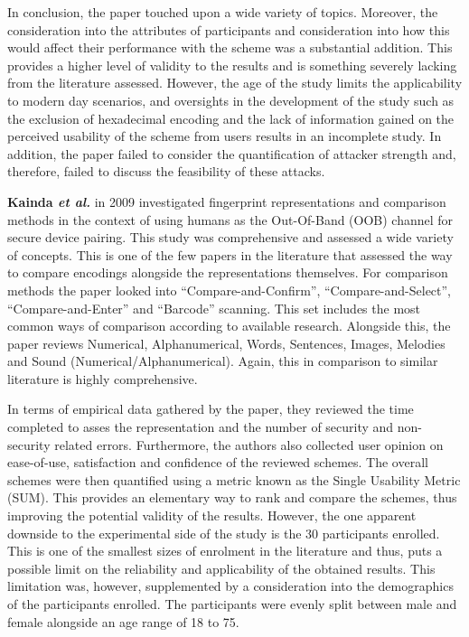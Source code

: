 In conclusion, the paper touched upon a wide variety of topics. Moreover, the consideration into the attributes of participants and consideration into how this would affect their performance with the scheme was a substantial addition. This provides a higher level of validity to the results and is something severely lacking from the literature assessed. However, the age of the study limits the applicability to modern day scenarios, and oversights in the development of the study such as the exclusion of hexadecimal encoding and the lack of information gained on the perceived usability of the scheme from users results in an incomplete study. In addition, the paper failed to consider the quantification of attacker strength and, therefore, failed to discuss the feasibility of these attacks.

\textbf{Kainda \textit{et al.}}\cite{kainda2009usability} in 2009 investigated fingerprint representations and comparison methods in the context of using humans as the Out-Of-Band (OOB) channel for secure device pairing. This study was comprehensive and assessed a wide variety of concepts. This is one of the few papers in the literature that assessed the way to compare encodings alongside the representations themselves. For comparison methods the paper looked into ``Compare-and-Confirm'', ``Compare-and-Select'', ``Compare-and-Enter'' and ``Barcode'' scanning. This set includes the most common ways of comparison according to available research. Alongside this, the paper reviews Numerical, Alphanumerical, Words, Sentences, Images, Melodies and Sound (Numerical/Alphanumerical). Again, this in comparison to similar literature is highly comprehensive.

In terms of empirical data gathered by the paper, they reviewed the time completed to asses the representation and the number of security and non-security related errors. Furthermore, the authors also collected user opinion on ease-of-use, satisfaction and confidence of the reviewed schemes. The overall schemes were then quantified using a metric known as the Single Usability Metric (SUM)\cite{sauro2005method}. This provides an elementary way to rank and compare the schemes, thus improving the potential validity of the results. 
However, the one apparent downside to the experimental side of the study is the 30 participants enrolled. This is one of the smallest sizes of enrolment in the literature and thus, puts a possible limit on the reliability and applicability of the obtained results. This limitation was, however,  supplemented by a consideration into the demographics of the participants enrolled. The participants were evenly split between male and female alongside an age range of 18 to 75.

